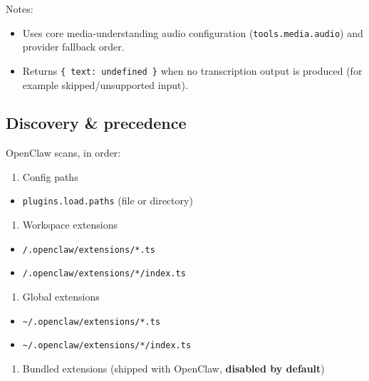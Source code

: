 Notes:

\begin{itemize}
  \item Uses core media-understanding audio configuration (\texttt{tools.media.audio}) and provider fallback order.
  \item Returns \texttt{\{ text: undefined \}} when no transcription output is produced (for example skipped/unsupported input).
\end{itemize}


\subsection{Discovery \& precedence}


OpenClaw scans, in order:

\begin{enumerate}
  \item Config paths
\end{enumerate}


\begin{itemize}
  \item \texttt{plugins.load.paths} (file or directory)
\end{itemize}


\begin{enumerate}
  \item Workspace extensions
\end{enumerate}


\begin{itemize}
  \item \texttt{/.openclaw/extensions/*.ts}
  \item \texttt{/.openclaw/extensions/*/index.ts}
\end{itemize}


\begin{enumerate}
  \item Global extensions
\end{enumerate}


\begin{itemize}
  \item \texttt{\textasciitilde{}/.openclaw/extensions/*.ts}
  \item \texttt{\textasciitilde{}/.openclaw/extensions/*/index.ts}
\end{itemize}


\begin{enumerate}
  \item Bundled extensions (shipped with OpenClaw, \textbf{disabled by default})
\end{enumerate}


